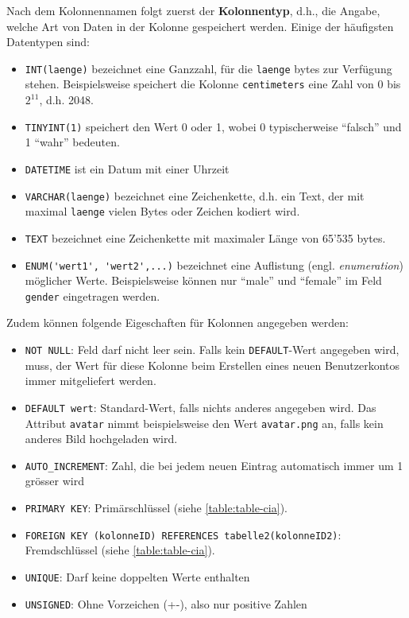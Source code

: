 Nach dem Kolonnennamen folgt zuerst der \textbf{Kolonnentyp}, d.h., die Angabe, welche Art von Daten in der Kolonne gespeichert werden. Einige der häufigsten Datentypen sind:
\begin{itemize}
  \item \lstinline|INT(laenge)| bezeichnet eine Ganzzahl, für die \texttt{laenge} bytes zur Verfügung stehen. Beispielsweise speichert die Kolonne \texttt{centimeters} eine Zahl von 0 bis $2^{11}$, d.h. 2048.
  \item \lstinline|TINYINT(1)| speichert den Wert 0 oder 1, wobei 0 typischerweise \enquote{falsch} und 1 \enquote{wahr} bedeuten.
  \item \lstinline|DATETIME| ist ein Datum mit einer Uhrzeit
  \item \lstinline|VARCHAR(laenge)| bezeichnet eine Zeichenkette, d.h. ein Text, der mit maximal \texttt{laenge} vielen Bytes oder Zeichen kodiert wird.
  \item \lstinline|TEXT| bezeichnet eine Zeichenkette mit maximaler Länge von 65'535 bytes.
  \item \lstinline|ENUM('wert1', 'wert2',...)| bezeichnet eine Auflistung (engl. \textit{enumeration}) möglicher Werte. Beispielsweise können nur \enquote{male} und \enquote{female} im Feld \texttt{gender} eingetragen werden.
\end{itemize}

Zudem können folgende Eigeschaften für Kolonnen angegeben werden:

\begin{itemize}
  \item \lstinline|NOT NULL|: Feld darf nicht leer sein. Falls kein \lstinline|DEFAULT|-Wert angegeben wird, muss, der Wert für diese Kolonne beim Erstellen eines neuen Benutzerkontos immer mitgeliefert werden.
  \item \lstinline|DEFAULT wert|: Standard-Wert, falls nichts anderes angegeben wird. Das Attribut \texttt{avatar} nimmt beispielsweise den Wert \texttt{avatar.png} an, falls kein anderes Bild hochgeladen wird.
  \item \lstinline|AUTO_INCREMENT|: Zahl, die bei jedem neuen Eintrag automatisch immer um 1 grösser wird
  \item \lstinline|PRIMARY KEY|: Primärschlüssel (siehe \cref{table:table-cia}).
  \item \lstinline|FOREIGN KEY (kolonneID) REFERENCES tabelle2(kolonneID2)|: Fremdschlüssel (siehe \cref{table:table-cia}).
  \item \lstinline|UNIQUE|: Darf keine doppelten Werte enthalten
  \item \lstinline|UNSIGNED|: Ohne Vorzeichen (+-), also nur positive Zahlen
\end{itemize}


